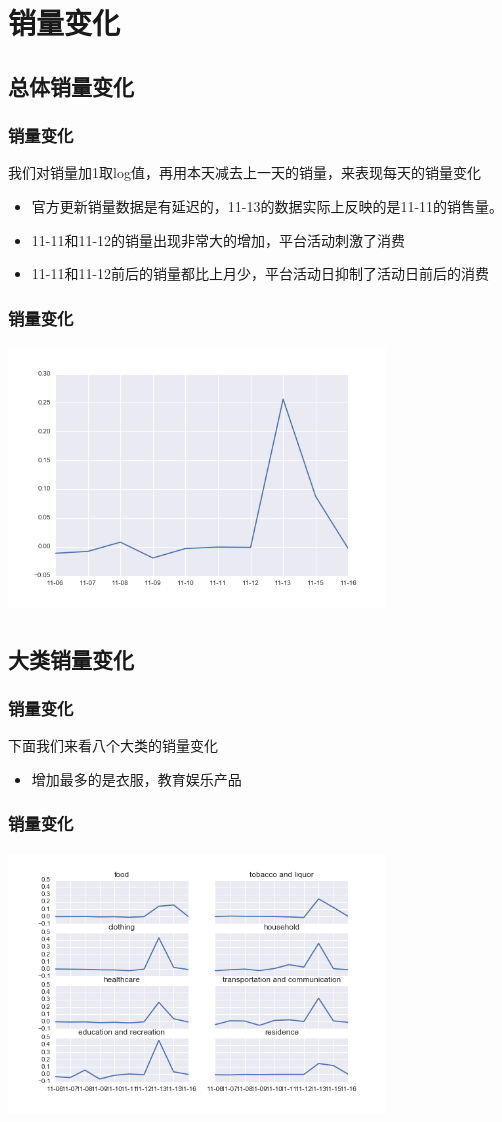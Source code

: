 \documentclass{beamer}
\begin{document}
\section{销量变化}
\subsection{总体销量变化}
\begin{frame}
\frametitle{销量变化}
我们对销量加1取log值，再用本天减去上一天的销量，来表现每天的销量变化
\begin{itemize}
  \item 官方更新销量数据是有延迟的，11-13的数据实际上反映的是11-11的销售量。
  \item 11-11和11-12的销量出现非常大的增加，平台活动刺激了消费
  \item 11-11和11-12前后的销量都比上月少，平台活动日抑制了活动日前后的消费
\end{itemize}
\end{frame}
\begin{frame}
\frametitle{销量变化}
\includegraphics[width=10cm,height=7cm]{double11_data_bigquatity.png}
\end{frame}

\subsection{大类销量变化}
\begin{frame}
\frametitle{销量变化}
下面我们来看八个大类的销量变化
\begin{itemize}
  \item 增加最多的是衣服，教育娱乐产品
\end{itemize}
\end{frame}
\begin{frame}
\frametitle{销量变化}
\includegraphics[width=10cm,height=7cm]{double11_data_totalquatity.png}
\end{frame}
\end{document}
